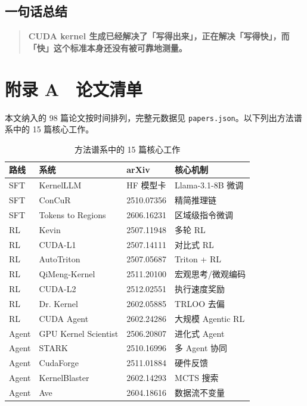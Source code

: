 \subsection{一句话总结}

\begin{quote}\small
\textbf{CUDA kernel 生成已经解决了「写得出来」，正在解决「写得快」，而「快」这个标准本身还没有被可靠地测量。}

\end{quote}

\section{附录 A　论文清单}

本文纳入的 98 篇论文按时间排列，完整元数据见 \texttt{papers.json}。以下列出方法谱系中的 15 篇核心工作。


\begin{table}[t]
\centering
\footnotesize
\setlength{\tabcolsep}{4pt}
\caption{方法谱系中的 15 篇核心工作}
\label{tab:12}
\begin{tabular}{llll}
\toprule
路线 & 系统 & arXiv & 核心机制 \\
\midrule
SFT & KernelLLM & HF 模型卡 & Llama-3.1-8B 微调 \\
SFT & ConCuR & 2510.07356 & 精简推理链 \\
SFT & Tokens to Regions & 2606.16231 & 区域级指令微调 \\
RL & Kevin & 2507.11948 & 多轮 RL \\
RL & CUDA-L1 & 2507.14111 & 对比式 RL \\
RL & AutoTriton & 2507.05687 & Triton + RL \\
RL & QiMeng-Kernel & 2511.20100 & 宏观思考/微观编码 \\
RL & CUDA-L2 & 2512.02551 & 执行速度奖励 \\
RL & Dr. Kernel & 2602.05885 & TRLOO 去偏 \\
RL & CUDA Agent & 2602.24286 & 大规模 Agentic RL \\
Agent & GPU Kernel Scientist & 2506.20807 & 进化式 Agent \\
Agent & STARK & 2510.16996 & 多 Agent 协同 \\
Agent & CudaForge & 2511.01884 & 硬件反馈 \\
Agent & KernelBlaster & 2602.14293 & MCTS 搜索 \\
Agent & Ave & 2604.18616 & 数据流不变量 \\
\bottomrule
\end{tabular}
\end{table}



